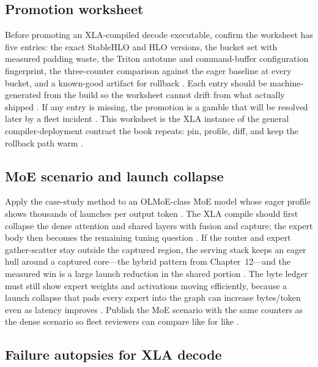 \subsection{Promotion worksheet}

Before promoting an XLA-compiled decode executable, confirm the worksheet has five entries: the exact StableHLO and HLO versions, the bucket set with measured padding waste, the Triton autotune and command-buffer configuration fingerprint, the three-counter comparison against the eager baseline at every bucket, and a known-good artifact for rollback \citep{openxla2024,memoryfloor2026,patel2025llminference}. Each entry should be machine-generated from the build so the worksheet cannot drift from what actually shipped \citep{yirage2026,chen2020compilerbasedhardw}. If any entry is missing, the promotion is a gamble that will be resolved later by a fleet incident \citep{taxbreak2026,memoryfloor2026}. This worksheet is the XLA instance of the general compiler-deployment contract the book repeats: pin, profile, diff, and keep the rollback path warm \citep{patel2025llminference,yirage2026}.

\subsection{MoE scenario and launch collapse}

Apply the case-study method to an OLMoE-class MoE model whose eager profile shows thousands of launches per output token \citep{taxbreak2026}. The XLA compile should first collapse the dense attention and shared layers with fusion and capture; the expert body then becomes the remaining tuning question \citep{openxla2024,patel2025llminference}. If the router and expert gather-scatter stay outside the captured region, the serving stack keeps an eager hull around a captured core---the hybrid pattern from Chapter~12---and the measured win is a large launch reduction in the shared portion \citep{nvidia2024cudagraphs,taxbreak2026}. The byte ledger must still show expert weights and activations moving efficiently, because a launch collapse that pads every expert into the graph can increase bytes/token even as latency improves \citep{memoryfloor2026,kwon2023vllm}. Publish the MoE scenario with the same counters as the dense scenario so fleet reviewers can compare like for like \citep{patel2025llminference,chen2020compilerbasedhardw}.

\subsection{Failure autopsies for XLA decode}


